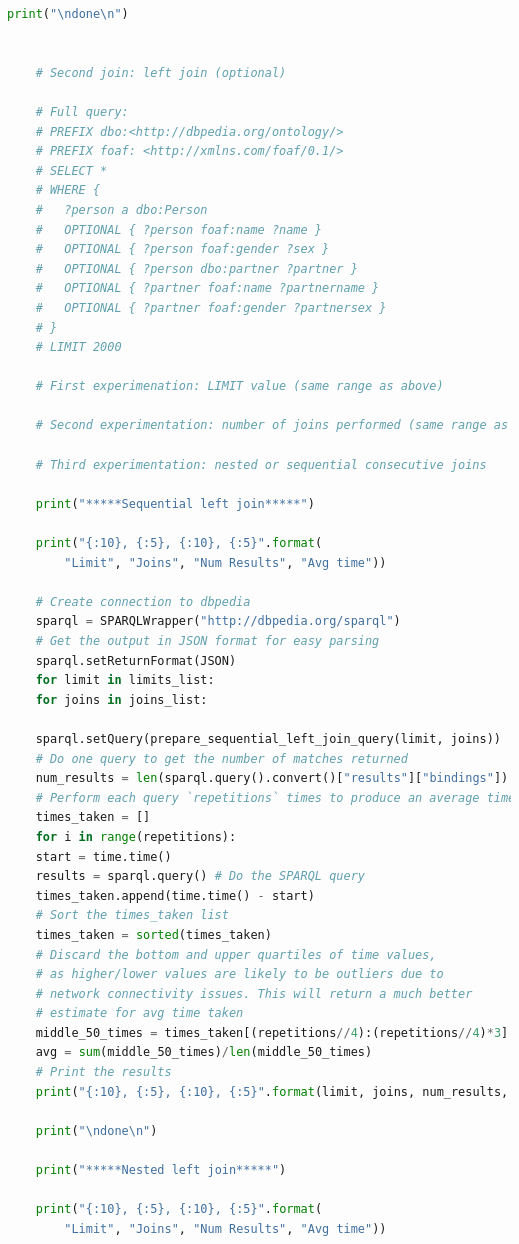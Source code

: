 \documentclass[10pt,a4paper]{article}
\begin{document}
\begin{lstlisting}[language=Python]
	print("\ndone\n")
	
	
	# Second join: left join (optional)
	
	# Full query:
	# PREFIX dbo:<http://dbpedia.org/ontology/>
	# PREFIX foaf: <http://xmlns.com/foaf/0.1/>
	# SELECT *
	# WHERE {
	#   ?person a dbo:Person
	#   OPTIONAL { ?person foaf:name ?name }
	#   OPTIONAL { ?person foaf:gender ?sex }
	#   OPTIONAL { ?person dbo:partner ?partner }
	#   OPTIONAL { ?partner foaf:name ?partnername }
	#   OPTIONAL { ?partner foaf:gender ?partnersex }
	# }
	# LIMIT 2000
	
	# First experimenation: LIMIT value (same range as above)
	
	# Second experimentation: number of joins performed (same range as above)
	
	# Third experimentation: nested or sequential consecutive joins
	
	print("*****Sequential left join*****")
	
	print("{:10}, {:5}, {:10}, {:5}".format(
		"Limit", "Joins", "Num Results", "Avg time"))
	
	# Create connection to dbpedia
	sparql = SPARQLWrapper("http://dbpedia.org/sparql")
	# Get the output in JSON format for easy parsing
	sparql.setReturnFormat(JSON)
	for limit in limits_list:
	for joins in joins_list:
	
	sparql.setQuery(prepare_sequential_left_join_query(limit, joins))
	# Do one query to get the number of matches returned
	num_results = len(sparql.query().convert()["results"]["bindings"]) 
	# Perform each query `repetitions` times to produce an average time required
	times_taken = []
	for i in range(repetitions):
	start = time.time()
	results = sparql.query() # Do the SPARQL query
	times_taken.append(time.time() - start)
	# Sort the times_taken list
	times_taken = sorted(times_taken)
	# Discard the bottom and upper quartiles of time values,
	# as higher/lower values are likely to be outliers due to
	# network connectivity issues. This will return a much better
	# estimate for avg time taken
	middle_50_times = times_taken[(repetitions//4):(repetitions//4)*3]
	avg = sum(middle_50_times)/len(middle_50_times)
	# Print the results
	print("{:10}, {:5}, {:10}, {:5}".format(limit, joins, num_results, avg))
	
	print("\ndone\n")
	
	print("*****Nested left join*****")
	
	print("{:10}, {:5}, {:10}, {:5}".format(
		"Limit", "Joins", "Num Results", "Avg time"))
	

\end{lstlisting}
\end{document}
